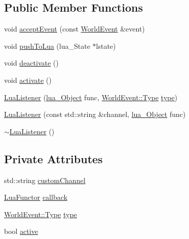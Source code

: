 \subsection*{Public Member Functions}
\begin{DoxyCompactItemize}
\item 
void \hyperlink{classZeta_1_1LuaListener_a2a146ab94f79bc94242e8f14d39fe11c}{accept\+Event} (const \hyperlink{classZeta_1_1WorldEvent}{World\+Event} \&event)
\item 
void \hyperlink{classZeta_1_1LuaListener_a4cd46326ef2704e9e8fbc1506509914a}{push\+To\+Lua} (lua\+\_\+\+State $\ast$lstate)
\item 
void \hyperlink{classZeta_1_1LuaListener_a504bb95fb6231769fbdc63fd5fdafc21}{deactivate} ()
\item 
void \hyperlink{classZeta_1_1LuaListener_ac57925d0b9780296c79cc39fcda24ebe}{activate} ()
\item 
\hyperlink{classZeta_1_1LuaListener_a7fd2cbabe7eff70aabff732f0da7e287}{Lua\+Listener} (\hyperlink{ZetaConfig_8hpp_ae7be32b73848041a60f2412f72bbb221}{lua\+\_\+\+Object} func, \hyperlink{classZeta_1_1WorldEvent_a92adb82c22c6f59afec5911098f85158}{World\+Event\+::\+Type} \hyperlink{classZeta_1_1LuaListener_acec59aa6dc0dcec125e577da5b2c42b5}{type})
\item 
\hyperlink{classZeta_1_1LuaListener_afb6eee0ff7b104acfbc9f298195f4524}{Lua\+Listener} (const std\+::string \&channel, \hyperlink{ZetaConfig_8hpp_ae7be32b73848041a60f2412f72bbb221}{lua\+\_\+\+Object} func)
\item 
\hyperlink{classZeta_1_1LuaListener_ac7e40cd001c0c272ecf2bb3d21856363}{$\sim$\+Lua\+Listener} ()
\end{DoxyCompactItemize}
\subsection*{Private Attributes}
\begin{DoxyCompactItemize}
\item 
std\+::string \hyperlink{classZeta_1_1LuaListener_a54cdfbad704945bc74e36ef3af9eaaed}{custom\+Channel}
\item 
\hyperlink{classZeta_1_1LuaFunctor}{Lua\+Functor} \hyperlink{classZeta_1_1LuaListener_a5ed6fcdda5ab83eeb8a3fea904f22aaf}{callback}
\item 
\hyperlink{classZeta_1_1WorldEvent_a92adb82c22c6f59afec5911098f85158}{World\+Event\+::\+Type} \hyperlink{classZeta_1_1LuaListener_acec59aa6dc0dcec125e577da5b2c42b5}{type}
\item 
bool \hyperlink{classZeta_1_1LuaListener_a6e7d565c03b9774a1c8222abaa88a37b}{active}
\end{DoxyCompactItemize}


